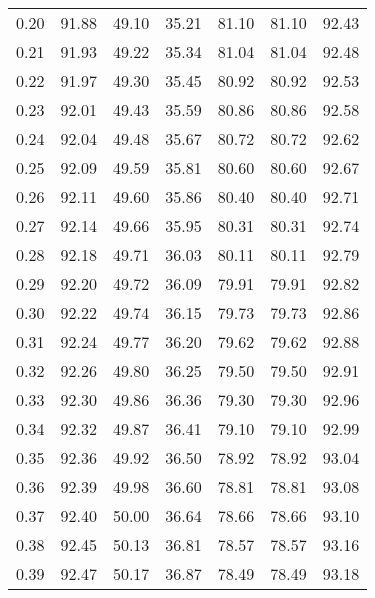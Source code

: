 \begin{tabular}{|c|c|c|c|c|c|c|}
      0.20 &     91.88 &     49.10 &      35.21 &   81.10 &      81.10 &         92.43 \\
      0.21 &     91.93 &     49.22 &      35.34 &   81.04 &      81.04 &         92.48 \\
      0.22 &     91.97 &     49.30 &      35.45 &   80.92 &      80.92 &         92.53 \\
      0.23 &     92.01 &     49.43 &      35.59 &   80.86 &      80.86 &         92.58 \\
      0.24 &     92.04 &     49.48 &      35.67 &   80.72 &      80.72 &         92.62 \\
      0.25 &     92.09 &     49.59 &      35.81 &   80.60 &      80.60 &         92.67 \\
      0.26 &     92.11 &     49.60 &      35.86 &   80.40 &      80.40 &         92.71 \\
      0.27 &     92.14 &     49.66 &      35.95 &   80.31 &      80.31 &         92.74 \\
      0.28 &     92.18 &     49.71 &      36.03 &   80.11 &      80.11 &         92.79 \\
      0.29 &     92.20 &     49.72 &      36.09 &   79.91 &      79.91 &         92.82 \\
      0.30 &     92.22 &     49.74 &      36.15 &   79.73 &      79.73 &         92.86 \\
      0.31 &     92.24 &     49.77 &      36.20 &   79.62 &      79.62 &         92.88 \\
      0.32 &     92.26 &     49.80 &      36.25 &   79.50 &      79.50 &         92.91 \\
      0.33 &     92.30 &     49.86 &      36.36 &   79.30 &      79.30 &         92.96 \\
      0.34 &     92.32 &     49.87 &      36.41 &   79.10 &      79.10 &         92.99 \\
      0.35 &     92.36 &     49.92 &      36.50 &   78.92 &      78.92 &         93.04 \\
      0.36 &     92.39 &     49.98 &      36.60 &   78.81 &      78.81 &         93.08 \\
      0.37 &     92.40 &     50.00 &      36.64 &   78.66 &      78.66 &         93.10 \\
      0.38 &     92.45 &     50.13 &      36.81 &   78.57 &      78.57 &         93.16 \\
      0.39 &     92.47 &     50.17 &      36.87 &   78.49 &      78.49 &         93.18 \\

\end{tabular}
